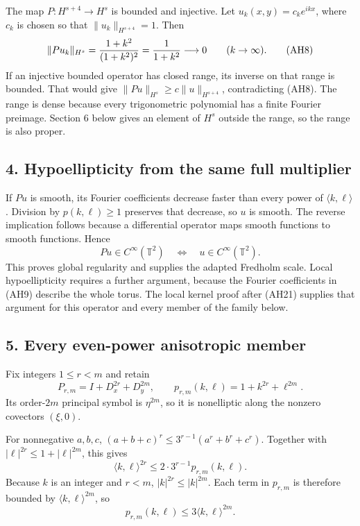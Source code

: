 \documentclass[
  11pt,
]{article}
\begin{document}
The map \(P:H^{s+4}\to H^s\) is bounded and injective. Let
\(u_k(x,y)=c_ke^{ikx}\), where \(c_k\) is chosen so that
\(\|u_k\|_{H^{s+4}}=1\). Then \[
 \|Pu_k\|_{H^s}
       ={1+k^2\over(1+k^2)^2}
       ={1\over1+k^2}\longrightarrow0
       \qquad (k\to\infty).
 \tag{AH8}
\] If an injective bounded operator has closed range, its inverse on
that range is bounded. That would give
\(\|Pu\|_{H^s}\geq c\|u\|_{H^{s+4}}\), contradicting (AH8). The range is
dense because every trigonometric polynomial has a finite Fourier
preimage. Section 6 below gives an element of \(H^s\) outside the range,
so the range is also proper.

\subsection{4. Hypoellipticity from the same full
multiplier}\label{hypoellipticity-from-the-same-full-multiplier}

If \(Pu\) is smooth, its Fourier coefficients decrease faster than every
power of \(\langle k,\ell\rangle\). Division by \(p(k,\ell)\geq1\)
preserves that decrease, so \(u\) is smooth. The reverse implication
follows because a differential operator maps smooth functions to smooth
functions. Hence \[
 Pu\in C^\infty(\mathbb T^2)
       \quad\Longleftrightarrow\quad
 u\in C^\infty(\mathbb T^2).
 \tag{AH9}
\] This proves global regularity and supplies the adapted Fredholm
scale. Local hypoellipticity requires a further argument, because the
Fourier coefficients in (AH9) describe the whole torus. The local kernel
proof after (AH21) supplies that argument for this operator and every
member of the family below.

\subsection{5. Every even-power anisotropic
member}\label{every-even-power-anisotropic-member}

Fix integers \(1\leq r<m\) and retain \[
 P_{r,m}=I+D_x^{2r}+D_y^{2m},\qquad
 p_{r,m}(k,\ell)=1+k^{2r}+\ell^{2m}.
 \tag{AH10}
\] Its order-\(2m\) principal symbol is \(\eta^{2m}\), so it is
nonelliptic along the nonzero covectors \((\xi,0)\).

For nonnegative \(a,b,c\), \((a+b+c)^r\leq3^{r-1}(a^r+b^r+c^r)\).
Together with \(|\ell|^{2r}\leq1+|\ell|^{2m}\), this gives \[
 \langle k,\ell\rangle^{2r}
 \leq 2\cdot3^{r-1}p_{r,m}(k,\ell).
 \tag{AH11}
\] Because \(k\) is an integer and \(r<m\), \(|k|^{2r}\leq|k|^{2m}\).
Each term in \(p_{r,m}\) is therefore bounded by
\(\langle k,\ell\rangle^{2m}\), so \[
 p_{r,m}(k,\ell)
 \leq3\langle k,\ell\rangle^{2m}.
 \tag{AH12}
\]
\end{document}
